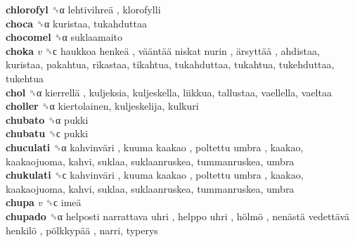 \textbf{chlorofyl} ␝α   lehtivihreä , klorofylli  \\
\textbf{choca} ␝α  kuristaa, tukahduttaa  \\
\textbf{chocomel} ␝α  suklaamaito  \\
\textbf{choka} \emph{v}  ␝ϲ   haukkoa henkeä ,  vääntää niskat nurin ,  ärsyttää , ahdistaa, kuristaa, pakahtua, rikastaa, tikahtua, tukahduttaa, tukahtua, tukehduttaa, tukehtua  \\
\textbf{chol} ␝α   kierrellä , kuljeksia, kuljeskella, liikkua, tallustaa, vaellella, vaeltaa  \\
\textbf{choller} ␝α  kiertolainen, kuljeskelija, kulkuri  \\
\textbf{chubato} ␝α  pukki  \\
\textbf{chubatu} ␝ϲ  pukki  \\
\textbf{chuculati} ␝α   kahvinväri ,  kuuma kaakao ,  poltettu umbra , kaakao, kaakaojuoma, kahvi, suklaa, suklaanruskea, tummanruskea, umbra  \\
\textbf{chukulati} ␝ϲ   kahvinväri ,  kuuma kaakao ,  poltettu umbra , kaakao, kaakaojuoma, kahvi, suklaa, suklaanruskea, tummanruskea, umbra  \\
\textbf{chupa} \emph{v}  ␝ϲ   imeä   \\
\textbf{chupado} ␝α   helposti narrattava uhri ,  helppo uhri ,  hölmö ,  nenästä vedettävä henkilö ,  pölkkypää , narri, typerys  \\
